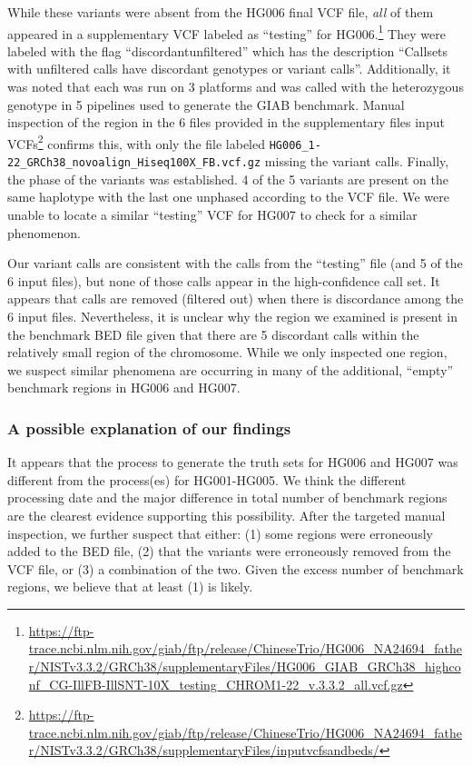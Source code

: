 While these variants were absent from the HG006 final VCF file, \textit{all} of them appeared in a supplementary VCF labeled as ``testing'' for HG006.\footnote{\url{https://ftp-trace.ncbi.nlm.nih.gov/giab/ftp/release/ChineseTrio/HG006_NA24694_father/NISTv3.3.2/GRCh38/supplementaryFiles/HG006_GIAB_GRCh38_highconf_CG-IllFB-IllSNT-10X_testing_CHROM1-22_v.3.3.2_all.vcf.gz}}
They were labeled with the flag ``discordantunfiltered'' which has the description ``Callsets with unfiltered calls have discordant genotypes or variant calls''.
Additionally, it was noted that each was run on 3 platforms and was called with the heterozygous genotype in 5 pipelines used to generate the GIAB benchmark.
Manual inspection of the region in the 6 files provided in the supplementary files input VCFs\footnote{\url{https://ftp-trace.ncbi.nlm.nih.gov/giab/ftp/release/ChineseTrio/HG006_NA24694_father/NISTv3.3.2/GRCh38/supplementaryFiles/inputvcfsandbeds/}} confirms this, with only the file labeled \texttt{HG006\_1-22\_GRCh38\_novoalign\_Hiseq100X\_FB.vcf.gz} missing the variant calls.
Finally, the phase of the variants was established. 
4 of the 5 variants are present on the same haplotype with the last one unphased according to the VCF file.
We were unable to locate a similar ``testing'' VCF for HG007 to check for a similar phenomenon.

Our variant calls are consistent with the calls from the ``testing'' file (and 5 of the 6 input files), but none of those calls appear in the high-confidence call set.
It appears that calls are removed (filtered out) when there is discordance among the 6 input files. 
Nevertheless, it is unclear why the region we examined is present in the benchmark BED file given that there are 5 discordant calls within the relatively small region of the chromosome.
While we only inspected one region, we suspect similar phenomena are occurring in many of the additional, ``empty'' benchmark regions in HG006 and HG007. 

\subsubsection{A possible explanation of our findings}
It appears that the process to generate the truth sets for HG006 and HG007 was different from the process(es) for HG001-HG005.
We think the different processing date and the major difference in total number of benchmark regions are the clearest evidence supporting this possibility.
After the targeted manual inspection, we further suspect that either: (1) some regions were erroneously added to the BED file, (2) that the variants were erroneously removed from the VCF file, or (3) a combination of the two.
Given the excess number of benchmark regions, we believe that at least (1) is likely.

